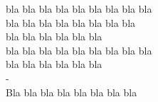 \null{}
\begin{flushright}
{\it{

bla bla bla bla bla bla bla bla bla \\
bla bla bla bla bla bla bla bla \\
bla bla bla bla bla bla \\
bla bla bla bla bla bla bla bla bla \\
bla bla bla bla bla bla \\
- \\
Bla bla bla bla bla bla bla bla \\

}}
\end{flushright}
\null
\newpage
